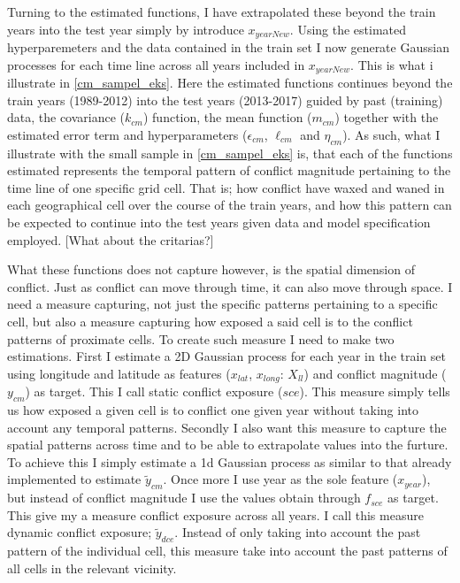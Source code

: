 \documentclass[a4paper]{article}
\begin{document}
Turning to the estimated functions, I have extrapolated these beyond the train years into the test year simply by introduce $x_{yearNew}$. Using the estimated hyperparemeters and the data contained in the train set I now generate Gaussian processes for each time line across all years included in $x_{yearNew}$. This is what i illustrate in \autoref{cm_sampel_eks}. Here the estimated functions continues beyond the train years (1989-2012) into the test years (2013-2017) guided by past (training) data, the covariance ($k_{cm}$) function, the mean function ($m_{cm}$) together with the estimated error term and hyperparameters ($\epsilon_{cm}$, $\ell_{cm}$ and $\eta_{cm}$). As such, what I illustrate with the small sample in \autoref{cm_sampel_eks} is, that each of the functions estimated represents the temporal pattern of conflict magnitude pertaining to the time line of one specific grid cell. That is; how conflict have waxed and waned in each geographical cell over the course of the train years, and how this pattern can be expected to continue into the test years given data and model specification employed. [What about the critarias?]\par

What these functions does not capture however, is the spatial dimension of conflict. Just as conflict can move through time, it can also move through space. I need a measure capturing, not just the specific patterns pertaining to a specific cell, but also a measure capturing how exposed a said cell is to the conflict patterns of proximate cells. To create such measure I need to make two estimations. First I estimate a 2D Gaussian process for each year in the train set using longitude and latitude as features ($x_{lat}$, $x_{long}$: $X_{ll}$) and conflict magnitude  ($y_{cm}$) as target. This I call static conflict exposure ($sce$). This measure simply tells us how exposed a given cell is to conflict one given year without taking into account any temporal patterns. Secondly I also want this measure to capture the spatial patterns across time and to be able to extrapolate values into the furture. To achieve this I simply estimate a 1d Gaussian process as similar to that already implemented to estimate $\tilde{y}_{cm}$. Once more I use year as the sole feature ($x_{year}$), but instead of conflict magnitude I use the values obtain through $f_{sce}$ as target. This give my a measure conflict exposure across all years. I call this measure dynamic conflict exposure; $\tilde{y}_{dce}$. Instead of only taking into account the past pattern of the individual cell, this measure take into account the past patterns of all cells in the relevant vicinity.\par 
\end{document}
